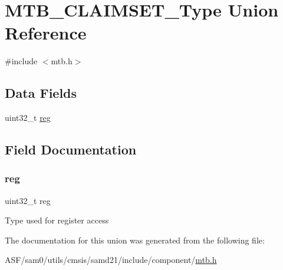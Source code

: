 \hypertarget{union_m_t_b___c_l_a_i_m_s_e_t___type}{}\section{M\+T\+B\+\_\+\+C\+L\+A\+I\+M\+S\+E\+T\+\_\+\+Type Union Reference}
\label{union_m_t_b___c_l_a_i_m_s_e_t___type}


{\ttfamily \#include $<$mtb.\+h$>$}

\subsection*{Data Fields}
\begin{DoxyCompactItemize}
\item 
uint32\+\_\+t \mbox{\hyperlink{union_m_t_b___c_l_a_i_m_s_e_t___type_a6b91636401516a477989a336376d7b40}{reg}}
\end{DoxyCompactItemize}


\subsection{Field Documentation}
\mbox{\label{union_m_t_b___c_l_a_i_m_s_e_t___type_a6b91636401516a477989a336376d7b40}} 
\subsubsection{\texorpdfstring{reg}{reg}}
{\footnotesize\ttfamily uint32\+\_\+t reg}

Type used for register access 

The documentation for this union was generated from the following file\+:\begin{DoxyCompactItemize}
\item 
A\+S\+F/sam0/utils/cmsis/samd21/include/component/\mbox{\hyperlink{component_2mtb_8h}{mtb.\+h}}\end{DoxyCompactItemize}
